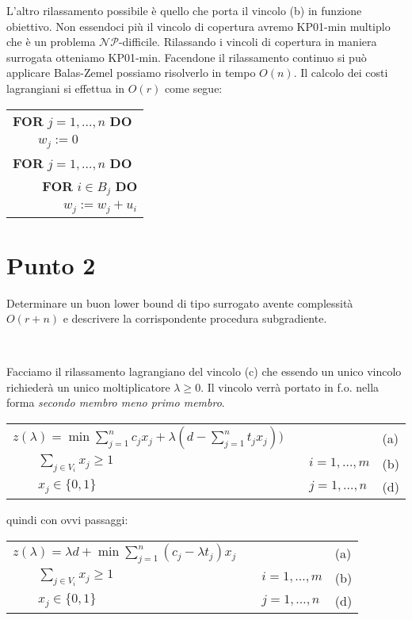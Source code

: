 \documentclass[11pt]{book}
\begin{document}
L'altro rilassamento possibile \`e quello che porta il vincolo (b) in
funzione obiettivo. Non essendoci pi\`u il vincolo di copertura avremo
KP01-min multiplo che \`e un problema
$\mathcal{NP}$-difficile. Rilassando i vincoli di copertura in maniera
surrogata otteniamo KP01-min. Facendone il rilassamento continuo si
pu\`o applicare Balas-Zemel possiamo risolverlo in tempo $O(n)$. Il
calcolo dei costi lagrangiani si effettua in $O(r)$ come segue:

\vspace{20pt}
\begin{tabular}{l}
\textbf{FOR} $j=1,\dots,n$ \textbf{DO}\\
$\qquad w_j := 0$\\
\textbf{FOR} $j=1,\dots,n$ \textbf{DO}\\
$\qquad$ \textbf{FOR} $i\in B_j$ \textbf{DO}\\
$\qquad\qquad w_j := w_j + u_i$
\end{tabular}
\vspace{20pt}

\section*{Punto 2}

Determinare un buon lower bound di tipo surrogato avente complessit\`a
$O(r+n)$ e descrivere la corrispondente procedura subgradiente.

\

Facciamo il rilassamento lagrangiano del vincolo (c) che essendo un
unico vincolo richieder\`a un unico moltiplicatore $\lambda \geq
0$. Il vincolo verr\`a portato in f.o. nella forma \textit{secondo
  membro meno primo membro}.

\begin{center}
\begin{tabular}{lp{2cm}ll}
  $z(\lambda) = \min \sum\limits_{j=1}^n c_jx_j + \lambda (d -
  \sum\limits_{j=1}^n t_jx_j))$ & & & (a)\\
  $\qquad \sum\limits_{j\in V_i}x_j \geq 1$ & & $i=1,\dots,m$ & (b)\\
  $\qquad x_j \in\{0,1\}$ & & $j = 1,\dots,n$ & (d) \\
\end{tabular}
\end{center}

quindi con ovvi passaggi:

\begin{center}
\begin{tabular}{lp{2cm}ll}
  $z(\lambda) = \lambda d + \min \sum\limits_{j=1}^n (c_j-\lambda t_j)x_j$ & & & (a)\\
  $\qquad \sum\limits_{j\in V_i}x_j \geq 1$ & & $i=1,\dots,m$ & (b)\\
  $\qquad x_j \in\{0,1\}$ & & $j = 1,\dots,n$ & (d) \\
\end{tabular}
\end{center}
\end{document}
